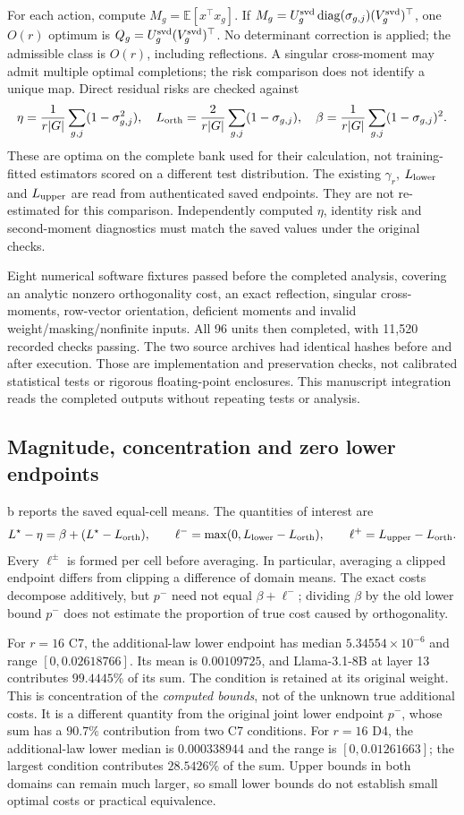 For each action, compute $M_g=\mathbb E[x^\top x_g]$. If $M_g=U_g^{\rm svd}\operatorname{diag}(\sigma_{g,j})(V_g^{\rm svd})^\top$, one $O(r)$ optimum is $Q_g=U_g^{\rm svd}(V_g^{\rm svd})^\top$. No determinant correction is applied; the admissible class is $O(r)$, including reflections. A singular cross-moment may admit multiple optimal completions; the risk comparison does not identify a unique map. Direct residual risks are checked against
\[
 \eta=\frac{1}{r|G|}\sum_{g,j}(1-\sigma_{g,j}^2),\quad
 L_{\rm orth}=\frac{2}{r|G|}\sum_{g,j}(1-\sigma_{g,j}),\quad
 \beta=\frac{1}{r|G|}\sum_{g,j}(1-\sigma_{g,j})^2.
\]
These are optima on the complete bank used for their calculation, not training-fitted estimators scored on a different test distribution. The existing $\gamma_r$, $L_{\rm lower}$ and $L_{\rm upper}$ are read from authenticated saved endpoints. They are not re-estimated for this comparison. Independently computed $\eta$, identity risk and second-moment diagnostics must match the saved values under the original checks.

Eight numerical software fixtures passed before the completed analysis, covering an analytic nonzero orthogonality cost, an exact reflection, singular cross-moments, row-vector orientation, deficient moments and invalid weight/masking/nonfinite inputs. All 96 units then completed, with 11,520 recorded checks passing. The two source archives had identical hashes before and after execution. Those are implementation and preservation checks, not calibrated statistical tests or rigorous floating-point enclosures. This manuscript integration reads the completed outputs without repeating tests or analysis.

\subsection{Magnitude, concentration and zero lower endpoints}
b reports the saved equal-cell means. The quantities of interest are
\[
 L^\star-\eta=\beta+(L^\star-L_{\rm orth}),\qquad
 \ell^-=\max(0,L_{\rm lower}-L_{\rm orth}),\qquad
 \ell^+=L_{\rm upper}-L_{\rm orth}.
\]
Every $\ell^\pm$ is formed per cell before averaging. In particular, averaging a clipped endpoint differs from clipping a difference of domain means. The exact costs decompose additively, but $p^-$ need not equal $\beta+\ell^-$; dividing $\beta$ by the old lower bound $p^-$ does not estimate the proportion of true cost caused by orthogonality.

For $r=16$ C7, the additional-law lower endpoint has median $5.34554\times10^{-6}$ and range $[0,0.02618766]$. Its mean is $0.00109725$, and Llama-3.1-8B at layer 13 contributes $99.4445\%$ of its sum. The condition is retained at its original weight. This is concentration of the \emph{computed bounds}, not of the unknown true additional costs. It is a different quantity from the original joint lower endpoint $p^-$, whose sum has a $90.7\%$ contribution from two C7 conditions. For $r=16$ D4, the additional-law lower median is $0.000338944$ and the range is $[0,0.01261663]$; the largest condition contributes $28.5426\%$ of the sum. Upper bounds in both domains can remain much larger, so small lower bounds do not establish small optimal costs or practical equivalence.

